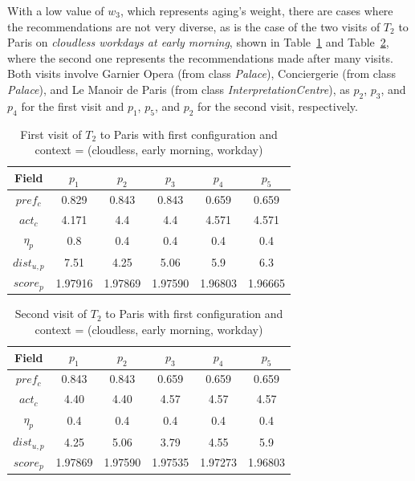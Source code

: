 With a low value of $w_3$, which represents aging's weight, there are cases where the recommendations are not very diverse, as is the case of the two visits of $T_2$ to Paris on {\it cloudless workdays at early morning}, shown in Table~\ref{table:t2-3} and Table~\ref{table:t2-4}, where the second one represents the recommendations made after many visits.
Both visits involve Garnier Opera (from class \textit{Palace}), Conciergerie (from class \textit{Palace}), and Le Manoir de Paris (from class \textit{InterpretationCentre}), as $p_2$, $p_3$, and $p_4$ for the first visit and $p_1$, $p_5$, and $p_2$ for the second visit, respectively.

\begin{table}[h!]
    \centering
        \caption{First visit of $T_2$ to Paris with first configuration and context = (cloudless, early morning, workday)}
    \label{table:t2-3}
    \begin{tabular}{ |c|c|c|c|c|c| } 
        \hline
        Field   & $p_1$ & $p_2$ & $p_3$ & $p_4$ & $p_5$ \\
        \hline
        $pref_c$    &  0.829 & 0.843 & 0.843 & 0.659 & 0.659 \\
        $act_c$     & 4.171 & 4.4 & 4.4 & 4.571 & 4.571 \\
        $\eta_p$    & 0.8 & 0.4 & 0.4 & 0.4 & 0.4 \\
        $dist_{u,p}$ & 7.51 & 4.25 & 5.06 & 5.9 & 6.3 \\
        $score_p$    & 1.97916 & 1.97869 & 1.97590 & 1.96803 & 1.96665 \\
        
        \hline
    \end{tabular}
\end{table}

\begin{table}[h!]
    \centering
        \caption{Second visit of $T_2$ to Paris with first configuration and context = (cloudless,  early morning, workday)}
    \label{table:t2-4}
    \begin{tabular}{ |c|c|c|c|c|c| } 
        \hline
        Field   & $p_1$ & $p_2$ & $p_3$ & $p_4$ & $p_5$ \\
        \hline
        $pref_c$    &  0.843 & 0.843 & 0.659 & 0.659 & 0.659 \\
        $act_c$     & 4.40 & 4.40 & 4.57 & 4.57 & 4.57  \\
        $\eta_p$    & 0.4 & 0.4 & 0.4 & 0.4 & 0.4 \\
        $dist_{u,p}$ & 4.25 & 5.06 & 3.79 & 4.55 & 5.9 \\
        $score_p$    & 1.97869 & 1.97590 & 1.97535 & 1.97273 & 1.96803 \\
        
        \hline
    \end{tabular}
\end{table}

